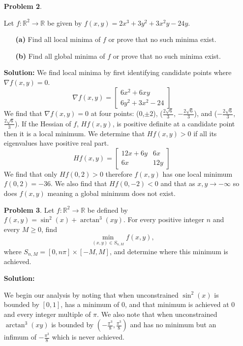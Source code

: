 \documentclass[12pt,letterpaper]{article}
\begin{document}
\begin{enumerate}
    \item[\textbf{Problem 2}.] {
    Let $f:\mathbb{R}^2\to\mathbb{R}$ be given by $f(x,y)=2x^3+3y^2+3x^2y-24y$. 
    \begin{enumerate}
        \item[\textbf{(a)}] Find all local minima of $f$ or prove that no such minima exist.
        \item[\textbf{(b)}] Find all global minima of $f$ or prove that no such minima exist.
    \end{enumerate}
    }
    \item[\textbf{Solution:}] {
    We find local minima by first identifying candidate points where $\nabla f(x,y) = 0$. 
    \begin{equation*}
        \nabla f(x,y) = \begin{bmatrix} 6x^2+6xy \\ 6y^2+3x^2-24\end{bmatrix}
    \end{equation*}
    We find that $\nabla f(x,y) = 0$ at four points: (0,$\pm 2$), ($\frac{2\sqrt{6}}{3}$, $-\frac{2\sqrt{6}}{3}$), and ($-\frac{2\sqrt{6}}{3}$, $\frac{2\sqrt{6}}{3}$). If the Hessian of $f$, $Hf(x,y)$, is positive definite at a candidate point then it is a local minimum. We determine that $Hf(x,y)>0$ if all its eigenvalues have positive real part.
    \begin{equation*}
        Hf(x,y) = \begin{bmatrix} 12x+6y & 6x \\ 6x & 12y \end{bmatrix}
    \end{equation*}
    }
    We find that only $Hf(0,2)>0$ therefore $f(x,y)$ has one local minimum $f(0,2)=-36$. We also find that $Hf(0,-2)<0$ and that as $x, y \to -\infty$ so does $f(x,y)$ meaning a global minimum does not exist.

    \item[\textbf{Problem 3}.] {
    Let $f:\mathbb{R}^2\to\mathbb{R}$ be defined by $f(x,y)=\sin^2(x)+\arctan^3(xy)$. For every positive integer $n$ and every $M\geq 0$, find $$\min_{(x,y)\in S_{n,M}} f(x,y)\textrm{,}$$ where $S_{n,M}=[0,n \pi]\times [-M,M]$, and determine where this minimum is achieved.
    }
    \item[\textbf{Solution:}] {
    We begin our analysis by noting that when unconstrained $\sin^2(x)$ is bounded by $[0,1]$, has a minimum of $0$, and that minimum is achieved at $0$ and every integer multiple of $\pi$. We also note that when unconstrained $\arctan^3(xy)$ is bounded by $(-\frac{\pi^3}{8},\frac{\pi^3}{8})$ and has no minimum but an infimum of $-\frac{\pi^3}{8}$ which is never achieved.
    
}
\end{enumerate}
\end{document}
